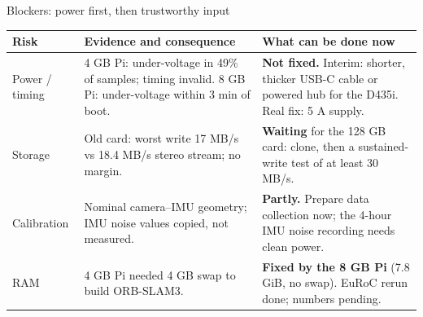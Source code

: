 \begin{frame}{Blockers: power first, then trustworthy input}
{\small\begin{tabular}{@{}L{28mm}L{80mm}L{76mm}@{}}\toprule
\textbf{Risk} & \textbf{Evidence and consequence} & \textbf{What can be done now}\\\midrule
Power / timing & 4 GB Pi: under-voltage in 49\% of samples; timing invalid. 8 GB Pi: under-voltage within 3 min of boot. & \textbf{Not fixed.} Interim: shorter, thicker USB-C cable or powered hub for the D435i. Real fix: 5 A supply.\\[5pt]
Storage & Old card: worst write 17 MB/s vs 18.4 MB/s stereo stream; no margin. & \textbf{Waiting} for the 128 GB card: clone, then a sustained-write test of at least 30 MB/s.\\[5pt]
Calibration & Nominal camera--IMU geometry; IMU noise values copied, not measured. & \textbf{Partly.} Prepare data collection now; the 4-hour IMU noise recording needs clean power.\\[5pt]
RAM & 4 GB Pi needed 4 GB swap to build ORB-SLAM3. & \textbf{Fixed by the 8 GB Pi} (7.8 GiB, no swap). EuRoC rerun done; numbers pending.\\\bottomrule
\end{tabular}}
\end{frame}

